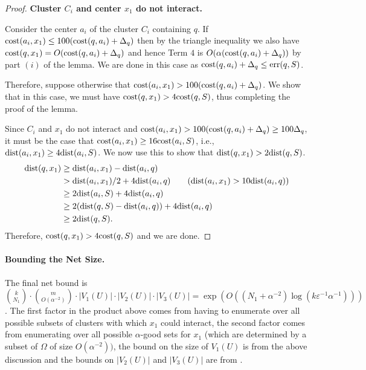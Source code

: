 \documentclass[11pt]{article}
\theoremstyle{restate}
\theoremstyle{definition}
\newcommand{\eps}{\ensuremath{\varepsilon}}
\newcommand{\dist}{\textnormal{dist}}
\newcommand{\cost}{\textnormal{cost}}
\newcommand{\err}{\textnormal{err}}
\begin{document}
\begin{proof}
\textbf{Cluster $C_i$ and center $x_1$ do not interact. }

Consider the center $a_i$ of the cluster $C_i$ containing $q$. If  $\cost(a_i,x_1) \leq 100(\cost(q, a_i) + \Delta_q)$ then by the triangle inequality we also have $\cost(q, x_1) = O(\cost(q,a_i) + \Delta_q)$ and hence Term $4$ is $O(\alpha( \cost(q,a_i) + \Delta_q))$ by part $(i)$ of the lemma. We are done in this case as $
\cost(q,a_i) + \Delta_q \leq \err(q,S)$.

Therefore, suppose otherwise that $\cost(a_i, x_1) > 100 (\cost(q,a_i) + \Delta_q)$. We show that in this case, we must have $\cost(q,x_1) > 4 \cost(q, S)$, thus completing the proof of the lemma. 

Since $C_i$ and $x_1$ do not interact and $\cost(a_i, x_1) > 100(\cost(q,a_i) + \Delta_q) \geq 100 \Delta_q$, it must be the case that $\cost(a_i, x_1) \geq 16 \cost(a_i,S)$, i.e.,  $\dist(a_i, x_1) \geq 4 \dist(a_i, S)$.  We now use this to show that $\dist(q, x_1) > 2 \dist(q, S)$. 
\begin{align*}
    \dist(q,x_1) &\geq \dist(a_i, x_1) - \dist(a_i, q)\\
    & > \dist(a_i, x_1)/2 + 4\dist(a_i, q) \tag{$\dist(a_i, x_1) > 10 \dist(a_i, q)$} \\ 
    &\geq 2 \dist(a_i, S) +4 \dist(a_i, q)\\
    & \geq 2 (\dist(q, S) - \dist(a_i, q)) + 4 \dist(a_i, q)\\
    & \geq 2 \dist(q,S).
\end{align*}
Therefore, $\cost(q,x_1) > 4 \cost(q,S)$ and we are done.
\end{proof}

\paragraph{Bounding the Net Size. } The final net bound is $\binom{k}{N_1} \cdot \binom{m}{O(\alpha^{-2})} \cdot |V_1(U)| \cdot |V_2(U)| \cdot |V_3(U)|= \exp(O((N_1 + \alpha^{-2}) \log(k \eps^{-1} \alpha^{-1})))$. The first factor in the product above comes from having to enumerate over all possible subsets of clusters with which $x_1$ could interact,  the second factor comes from enumerating over all possible $\alpha$-good sets for $x_1$ (which are determined by a subset of $\Omega$ of size $O(\alpha^{-2}))$, the bound on the size of $V_1(U)$ is from the above discussion and the bounds on $|V_2(U)|$ and $|V_3(U)|$ are from .
\end{document}

